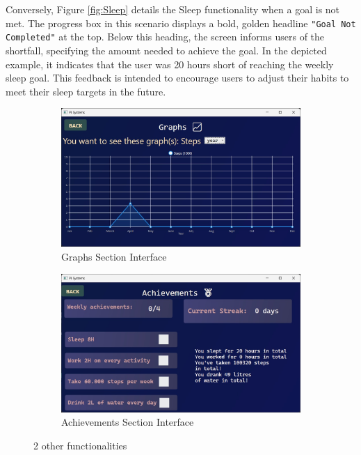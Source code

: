 \documentclass[12pt]{article}
\begin{document}
Conversely, Figure \ref{fig:Sleep} details the Sleep functionality when a goal is not met.
The progress box in this scenario displays a bold, golden headline \texttt{"Goal Not Completed"} at
the top. Below this heading, the screen informs users of the shortfall, specifying the 
amount needed to achieve the goal. In the depicted example, it indicates that the user 
was 20 hours short of reaching the weekly sleep goal. This feedback is intended to 
encourage users to adjust their habits to meet their sleep targets in the future.\par

\begin{figure}[h!]
  \centering
  \begin{subfigure}{0.4\linewidth}
    \includegraphics[width = \linewidth]{Graphs Screen}
    \caption{Graphs Section Interface}
    \label{fig:Graphs}
  \end{subfigure}
  \hfill

  \begin{subfigure}{0.4\linewidth}
    \includegraphics[width = \linewidth]{Achievements Screen}
    \caption{Achievements Section Interface}
    \label{fig:Achievements}
  \end{subfigure}

  \caption{2 other functionalities}
  \label{fig:subfunc}
\end{figure}
\end{document}
